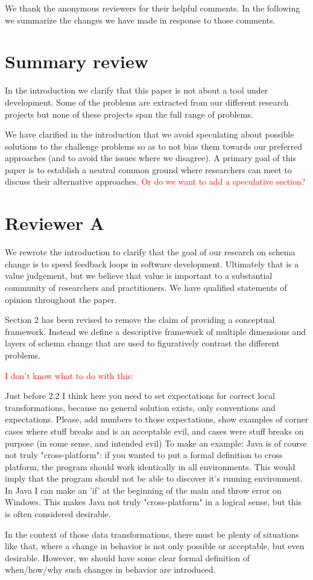 \documentclass{article}
\begin{document}
We thank the anonymous reviewers for their helpful comments. In the following we summarize the changes we have made in response to those comments.

\section{Summary review}

In the introduction we clarify that this paper is not about a tool under development. Some of the problems are extracted from our different research projects but none of these projects span the full range of problems.

We have clarified in the introduction that we avoid speculating about possible solutions to the challenge problems so as to not bias them towards our preferred approaches (and to avoid the issues where we disagree). A primary goal of this paper is to establish a neutral common ground where researchers can meet to discuss their alternative approaches.
\textcolor{red}{Or do we want to add a speculative section?}

\section{Reviewer A}

We rewrote the introduction to clarify that the goal of our research on schema change is to speed feedback loops in software development. Ultimately that is a value judgement, but we believe that value is important to a substantial community of researchers and practitioners. We have qualified statements of opinion throughout the paper.

Section 2 has been revised to remove the claim of providing a conceptual framework. Instead we define a descriptive framework of multiple dimensions and layers of schema change that are used to figuratively contrast the different problems.

\textcolor{red}{I don't know what to do with this:}
\begin{displayquote}
  Just before 2.2 I think here you need to set expectations for correct local transformations, because no general solution exists, only conventions and expectations. Please, add numbers to those expectations, show examples of corner cases where stuff breaks and is an acceptable evil, and cases were stuff breaks on purpose (in some sense, and intended evil) To make an example: Java is of course not truly "cross-platform": if you wanted to put a formal definition to cross platform, the program should work identically in all environments. This would imply that the program should not be able to discover it's running environment. In Java I can make an 'if' at the beginning of the main and throw error on Windows. This makes Java not truly "cross-platform" in a logical sense, but this is often considered desirable.

  In the context of those data transformations, there must be plenty of situations like that, where a change in behavior is not only possible or acceptable, but even desirable. However, we should have some clear formal definition of when/how/why such changes in behavior are introduced.
\end{displayquote}
\end{document}
